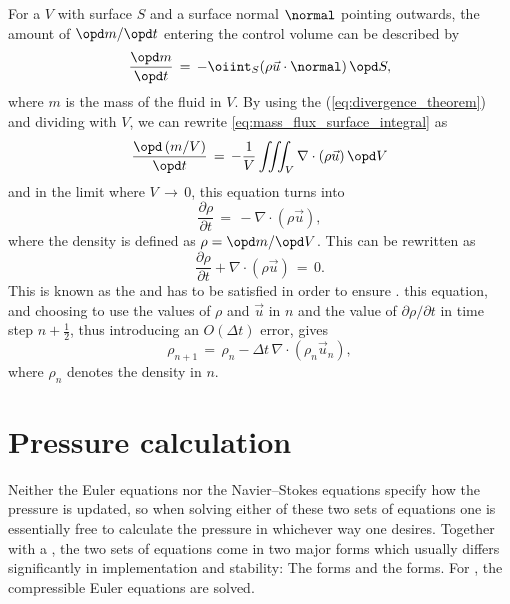 For a  $V$ with surface $S$ and a surface normal $\normal$ pointing outwards, the amount of  $\opd m/\opd t$ entering the control volume can be described by
%
\begin{equation} \label{eq:mass_flux_surface_integral}
\frac{\opd m}{\opd t} \,=\, -\oiint_S(\rho\vec{u}\cdot\normal)\,\opd S,
\end{equation}
%
where $m$ is the mass of the fluid in $V$. By using the  (\eqref{eq:divergence_theorem}) and dividing with $V$, we can rewrite \eqref{eq:mass_flux_surface_integral} as
%
\begin{equation} \label{eq:mass_flux_volume_integral}
\frac{\opd\,(m/V)}{\opd t} \,=\, -\frac{1}{V}\iiint_V\nabla\cdot(\rho\vec{u})\,\opd V
\end{equation}
%
and in the limit where $V \,\rightarrow\, 0$, this equation turns into
%
\begin{equation} \label{eq:density_partial_time_derivative}
\frac{\partial \rho}{\partial t} \,=\, -\nabla\cdot(\rho\vec{u}),
\end{equation}
%
where the density is defined as $\rho = \opd m/\opd V$. This can be rewritten as
%
\begin{equation} \label{eq:continuity_equation}
\frac{\partial \rho}{\partial t} + \nabla\cdot(\rho\vec{u}) \,=\, 0.
\end{equation}
%
This is known as the  and has to be satisfied in order to ensure .  this equation, and choosing to use the values of $\rho$ and $\vec{u}$ in \timestep $n$ and the value of $\partial \rho/\partial t$ in time step $n+\frac{1}{2}$, thus introducing an $O(\Delta t)$ error, gives
%
\begin{equation} \label{eq:continuity_equation_time_discretized}
\rho_{n+1} \,=\, \rho_{n} - \Delta t\,\nabla\cdot(\rho_{n}\vec{u}_{n}),
\end{equation}
%
where $\rho_n$ denotes the density in \timestep $n$.

\section{Pressure calculation}
\label{sec:pressure_calculation}

Neither the Euler equations nor the Navier--Stokes equations specify how the pressure is updated, so when solving either of these two sets of equations one is essentially free to calculate the pressure in whichever way one desires. Together with a , the two sets of equations come in two major forms which usually differs significantly in implementation and stability: The \compressible forms and the \incompressible forms. For \thisprojectwork, the compressible Euler equations are solved.

